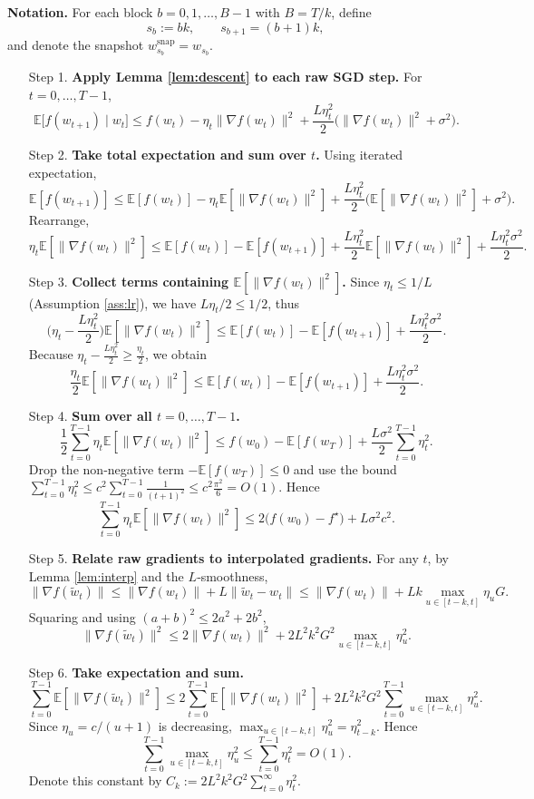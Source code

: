\documentclass{article}
\newcommand{\E}{\mathbb{E}}
\begin{document}
\noindent\textbf{Notation.} For each block $b=0,1,\dots,B-1$ with $B=T/k$, define
\[
    s_b:=bk,\qquad s_{b+1}= (b+1)k,
\]
and denote the snapshot $w^{\mathrm{snap}}_{s_b}=w_{s_b}$.

\begin{enumerate}
\item[Step 1.] \textbf{Apply Lemma \ref{lem:descent} to each raw SGD step.}  
For $t=0,\dots,T-1$,
\[
    \E\big[f(w_{t+1})\mid w_t\big]\le f(w_t)-\eta_t\|\nabla f(w_t)\|^{2}
    +\frac{L\eta_t^{2}}{2}\big(\|\nabla f(w_t)\|^{2}+\sigma^{2}\big).
\] 
\item[Step 2.] \textbf{Take total expectation and sum over $t$.}  
Using iterated expectation,
\[
    \E[f(w_{t+1})]\le \E[f(w_t)]-\eta_t\E[\|\nabla f(w_t)\|^{2}]
    +\frac{L\eta_t^{2}}{2}\big(\E[\|\nabla f(w_t)\|^{2}]+\sigma^{2}\big).
\] 
Rearrange,
\[
    \eta_t\E[\|\nabla f(w_t)\|^{2}]
    \le \E[f(w_t)]-\E[f(w_{t+1})]+\frac{L\eta_t^{2}}{2}\E[\|\nabla f(w_t)\|^{2}]
    +\frac{L\eta_t^{2}\sigma^{2}}{2}.
\] 
\item[Step 3.] \textbf{Collect terms containing $\E[\|\nabla f(w_t)\|^{2}]$.}  
Since $\eta_t\le 1/L$ (Assumption \ref{ass:lr}), we have $L\eta_t/2\le 1/2$, thus
\[
    \Big(\eta_t-\frac{L\eta_t^{2}}{2}\Big)\E[\|\nabla f(w_t)\|^{2}]
    \le \E[f(w_t)]-\E[f(w_{t+1})]+\frac{L\eta_t^{2}\sigma^{2}}{2}.
\] 
Because $\eta_t-\frac{L\eta_t^{2}}{2}\ge \frac{\eta_t}{2}$, we obtain
\[
    \frac{\eta_t}{2}\E[\|\nabla f(w_t)\|^{2}]
    \le \E[f(w_t)]-\E[f(w_{t+1})]+\frac{L\eta_t^{2}\sigma^{2}}{2}.
\] 
\item[Step 4.] \textbf{Sum over all $t=0,\dots,T-1$.}  
\[
    \frac12\sum_{t=0}^{T-1}\eta_t\E[\|\nabla f(w_t)\|^{2}]
    \le f(w_0)-\E[f(w_T)]+\frac{L\sigma^{2}}{2}\sum_{t=0}^{T-1}\eta_t^{2}.
\] 
Drop the non‑negative term $-\E[f(w_T)]\le 0$ and use the bound $\sum_{t=0}^{T-1}\eta_t^{2}\le c^{2}\sum_{t=0}^{T-1}\frac{1}{(t+1)^{2}}\le c^{2}\frac{\pi^{2}}{6}=O(1)$. Hence
\[
    \sum_{t=0}^{T-1}\eta_t\E[\|\nabla f(w_t)\|^{2}]
    \le 2\big(f(w_0)-f^{\star}\big)+L\sigma^{2}c^{2}.
\tag{4.1}
\] 
\item[Step 5.] \textbf{Relate raw gradients to interpolated gradients.}  
For any $t$, by Lemma \ref{lem:interp} and the $L$‑smoothness,
\[
    \|\nabla f(\tilde w_t)\| \le \|\nabla f(w_t)\|+L\|\tilde w_t-w_t\|
    \le \|\nabla f(w_t)\|+Lk\max_{u\in[t-k,t]}\eta_u G.
\] 
Squaring and using $(a+b)^{2}\le 2a^{2}+2b^{2}$,
\[
    \|\nabla f(\tilde w_t)\|^{2}
    \le 2\|\nabla f(w_t)\|^{2}+2L^{2}k^{2}G^{2}\max_{u\in[t-k,t]}\eta_u^{2}.
\] 
\item[Step 6.] \textbf{Take expectation and sum.}  
\[
    \sum_{t=0}^{T-1}\E[\|\nabla f(\tilde w_t)\|^{2}]
    \le 2\sum_{t=0}^{T-1}\E[\|\nabla f(w_t)\|^{2}]
        +2L^{2}k^{2}G^{2}\sum_{t=0}^{T-1}\max_{u\in[t-k,t]}\eta_u^{2}.
\] 
Since $\eta_u=c/(u+1)$ is decreasing, $\max_{u\in[t-k,t]}\eta_u^{2}=\eta_{t-k}^{2}$. Hence
\[
    \sum_{t=0}^{T-1}\max_{u\in[t-k,t]}\eta_u^{2}
    \le \sum_{t=0}^{T-1}\eta_{t}^{2}=O(1).
\] 
Denote this constant by $C_{k}:=2L^{2}k^{2}G^{2}\sum_{t=0}^{\infty}\eta_t^{2}$.


\end{enumerate}
\end{document}

